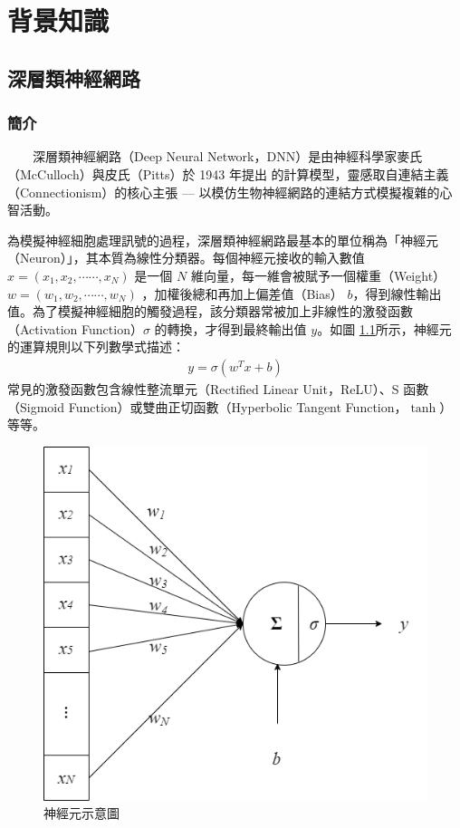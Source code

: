 
\chapter{背景知識}

\section{深層類神經網路}

\subsection{簡介}

　　深層類神經網路（Deep Neural Network，DNN）是由神經科學家麥氏（McCulloch）與皮氏（Pitts）於 1943 年提出 \cite{mcculloch_logical_1943} 的計算模型，靈感取自連結主義（Connectionism）的核心主張 --- 以模仿生物神經網路的連結方式模擬複雜的心智活動。

        為模擬神經細胞處理訊號的過程，深層類神經網路最基本的單位稱為「神經元（Neuron）」，其本質為線性分類器。每個神經元接收的輸入數值 $x = (x_1, x_2, \cdots\cdots, x_N)$ 是一個 $N$ 維向量，每一維會被賦予一個權重（Weight） $w = (w_1, w_2, \cdots\cdots, w_N)$  ，加權後總和再加上偏差值（Bias） $b$，得到線性輸出值。為了模擬神經細胞的觸發過程，該分類器常被加上非線性的激發函數（Activation Function）$\sigma$ 的轉換，才得到最終輸出值 $y$。如圖 \ref{fig:single-neuron}所示，神經元的運算規則以下列數學式描述：
\begin{align}
    y = \sigma(w^T x + b)
\end{align}
常見的激發函數包含線性整流單元（Rectified Linear Unit，ReLU）、S 函數（Sigmoid Function）或雙曲正切函數（Hyperbolic Tangent Function，$\tanh$）等等。

\begin{figure}
    \centering
    \includegraphics[width=0.5\linewidth]{figures/neuron.drawio.png}
    \caption{神經元示意圖}
    \label{fig:single-neuron}
\end{figure}

